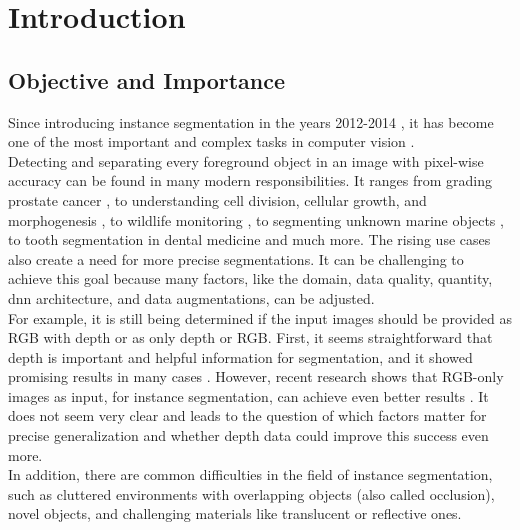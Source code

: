 
\chapter{Introduction}
\label{chap:kapitel1}



	\section{Objective and Importance}
	\label{sec:objective-and-importance}	
		Since introducing instance segmentation in the years 2012-2014 \cite{Yang2012}\cite{Silbermann2012}\cite{Hariharan2014}, it has become one of the most important and complex tasks in computer vision \cite{Sharma2022}. \\
		Detecting and separating every foreground object in an image with pixel-wise accuracy can be found in many modern responsibilities. It ranges from grading prostate cancer \cite{Hassan2022}, to understanding cell division, cellular growth, and morphogenesis \cite{Kar2022}, to wildlife monitoring \cite{Haucke2021}, to segmenting unknown marine objects \cite{Hu2024}, to tooth segmentation in dental medicine \cite{Brahmi2023} and much more. The rising use cases also create a need for more precise segmentations. It can be challenging to achieve this goal because many factors, like the domain, data quality, quantity, \ac{dnn} architecture, and data augmentations, can be adjusted.\\
		For example, it is still being determined if the input images should be provided as RGB with depth or as only depth or RGB. First, it seems straightforward that depth is important and helpful information for segmentation, and it showed promising results in many cases \cite{Danielczuk2019}\cite{Xie2021}. However, recent research shows that RGB-only images as input, for instance segmentation, can achieve even better results \cite{Raj2023}. It does not seem very clear and leads to the question of which factors matter for precise generalization and whether depth data could improve this success even more.\\
		In addition, there are common difficulties in the field of instance segmentation, such as cluttered environments with overlapping objects (also called occlusion), novel objects, and challenging materials like translucent or reflective ones.\\

